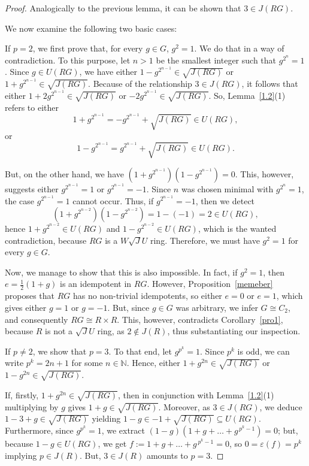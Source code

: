 \documentclass[12pt]{amsart}
\begin{document}
\begin{proof} Analogically to the previous lemma, it can be shown that $3 \in J(RG)$. 

We now examine the following two basic cases:

\medskip

 If $p = 2$, we first prove that, for every $g \in G$, $g^2 = 1$. We do that in a way of contradiction. To this purpose, let $n > 1$ be the smallest integer such that $g^{2^n} = 1$. Since $g \in U(RG)$, we have either $1 - g^{2^{n-1}} \in \sqrt{J(RG)}$ or $1 + g^{2^{n-1}} \in \sqrt{J(RG)}$. Because of the relationship $3 \in J(RG)$, it follows that either $1 + 2g^{2^{n-1}} \in \sqrt{J(RG)}$ or $- 2g^{2^{n-1}} \in \sqrt{J(RG)}$. So,
Lemma~\ref{1.2}(1) refers to either \[ 1 + g^{2^{n-1}} = -g^{2^{n-1}} + \sqrt{J(RG)} \in U(RG), \] or \[ 1 - g^{2^{n-1}} = g^{2^{n-1}} + \sqrt{J(RG)} \in U(RG). \] 

\noindent But, on the other hand, we have $(1 + g^{2^{n-1}})(1 - g^{2^{n-1}}) = 0$. This, however, suggests
either $g^{2^{n-1}} = 1$ or $g^{2^{n-1}} = -1$. Since $n$ was chosen minimal with $g^{2^n}=1$, the case
$g^{2^{n-1}} = 1$ cannot occur. Thus, if $g^{2^{n-1}} = -1$, then we detect $$(1 + g^{2^{n-2}})(1 - g^{2^{n-2}}) = 1 - (-1) = 2 \in U(RG),$$ hence $1 + g^{2^{n-2}} \in U(RG)$ and $1 - g^{2^{n-2}} \in U(RG)$, which is the wanted contradiction, because $RG$ is a $W\sqrt{J}U$ ring. Therefore, we must have $g^2 = 1$ for every $g \in G$.

Now, we manage to show that this is also impossible. In fact, if $g^2 = 1$, then $e = \frac12 (1 + g)$ is an idempotent in $RG$. However, Proposition~\ref{memeber} proposes that $RG$ has no non-trivial idempotents, so either $e = 0$ or $e = 1$, which gives either $g = 1$ or $g = -1$. But, since $g \in G$ was arbitrary, we infer $G \cong C_2$, and consequently $RG \cong R \times R$. This, however, contradicts Corollary~\ref{pro1}, because $R$ is not a $\sqrt{J}U$ ring, as $2 \not\in J(R)$, thus substantiating our inspection.

\medskip

 If $p \neq 2$, we show that $p = 3$. To that end, let $g^{p^k} = 1$. Since $p^k$ is odd, we can write $p^k = 2n + 1$ for some $n \in \mathbb{N}$. Hence, either $1 + g^{2n} \in \sqrt{J(RG)}$ or $1 - g^{2n} \in \sqrt{J(RG)}$.

If, firstly, $1 + g^{2n} \in \sqrt{J(RG)}$, then in conjunction with Lemma~\ref{1.2}(1) multiplying by $g$ gives $1 + g \in \sqrt{J(RG)}$. Moreover, as $3 \in J(RG)$, we deduce $1 - 3 + g \in \sqrt{J(RG)}$ yielding $1 - g \in -1 + \sqrt{J(RG)} \subseteq U(RG)$. Furthermore, since $g^{p^k} = 1$, we extract $(1 - g)(1 + g + \dots + g^{\,p^k-1}) = 0$; but, because $1 - g \in U(RG)$, we get $f := 1 + g + \dots + g^{\,p^k-1} = 0$, so $0 = \varepsilon(f) = p^k$ implying $p \in J(R)$. But, $3 \in J(R)$ amounts to $p = 3$.


\end{proof}
\end{document}
